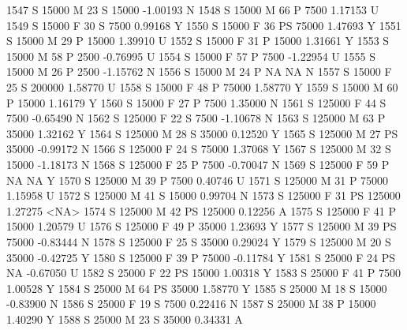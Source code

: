 \documentclass{article}
\begin{document}
\begin{Schunk}
\begin{Soutput}
1547      S      15000   M  23         S  15000  -1.00193    N
1548      S      15000   M  66         P   7500   1.17153    U
1549      S      15000   F  30         S   7500   0.99168    Y
1550      S      15000   F  36        PS  75000   1.47693    Y
1551      S      15000   M  29         P  15000   1.39910    U
1552      S      15000   F  31         P  15000   1.31661    Y
1553      S      15000   M  58         P   2500  -0.76995    U
1554      S      15000   F  57         P   7500  -1.22954    U
1555      S      15000   M  26         P   2500  -1.15762    N
1556      S      15000   M  24         P     NA        NA    N
1557      S      15000   F  25         S 200000   1.58770    U
1558      S      15000   F  48         P  75000   1.58770    Y
1559      S      15000   M  60         P  15000   1.16179    Y
1560      S      15000   F  27         P   7500   1.35000    N
1561      S     125000   F  44         S   7500  -0.65490    N
1562      S     125000   F  22         S   7500  -1.10678    N
1563      S     125000   M  63         P  35000   1.32162    Y
1564      S     125000   M  28         S  35000   0.12520    Y
1565      S     125000   M  27        PS  35000  -0.99172    N
1566      S     125000   F  24         S  75000   1.37068    Y
1567      S     125000   M  32         S  15000  -1.18173    N
1568      S     125000   F  25         P   7500  -0.70047    N
1569      S     125000   F  59         P     NA        NA    Y
1570      S     125000   M  39         P   7500   0.40746    U
1571      S     125000   M  31         P  75000   1.15958    U
1572      S     125000   M  41         S  15000   0.99704    N
1573      S     125000   F  31        PS 125000   1.27275 <NA>
1574      S     125000   M  42        PS 125000   0.12256    A
1575      S     125000   F  41         P  15000   1.20579    U
1576      S     125000   F  49         P  35000   1.23693    Y
1577      S     125000   M  39        PS  75000  -0.83444    N
1578      S     125000   F  25         S  35000   0.29024    Y
1579      S     125000   M  20         S  35000  -0.42725    Y
1580      S     125000   F  39         P  75000  -0.11784    Y
1581      S      25000   F  24        PS     NA  -0.67050    U
1582      S      25000   F  22        PS  15000   1.00318    Y
1583      S      25000   F  41         P   7500   1.00528    Y
1584      S      25000   M  64        PS  35000   1.58770    Y
1585      S      25000   M  18         S  15000  -0.83900    N
1586      S      25000   F  19         S   7500   0.22416    N
1587      S      25000   M  38         P  15000   1.40290    Y
1588      S      25000   M  23         S  35000   0.34331    A

\end{Soutput}
\end{Schunk}
\end{document}
